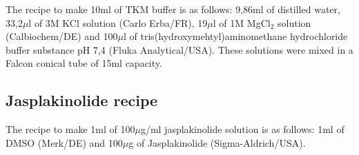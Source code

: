 \documentclass[12pt, a4paper]{article} %
\begin{document}
The recipe to make 10ml of TKM buffer is as follows: 9,86ml of distilled water, 33,2$\mu$l of 3M KCl solution (Carlo Erba/FR), 19$\mu$l of 1M MgCl$_{2}$ solution (Calbiochem/DE) and 100$\mu$l of tris(hydroxymehtyl)aminomethane hydrochloride buffer substance pH 7,4 (Fluka Analytical/USA). These solutions were mixed in a Falcon conical tube of 15ml capacity.

\subsection{Jasplakinolide recipe}

The recipe to make 1ml of 100$\mu$g/ml jasplakinolide solution is as follows: 1ml of DMSO (Merk/DE) and 100$\mu$g of Jasplakinolide (Sigma-Aldrich/USA).
\end{document}
